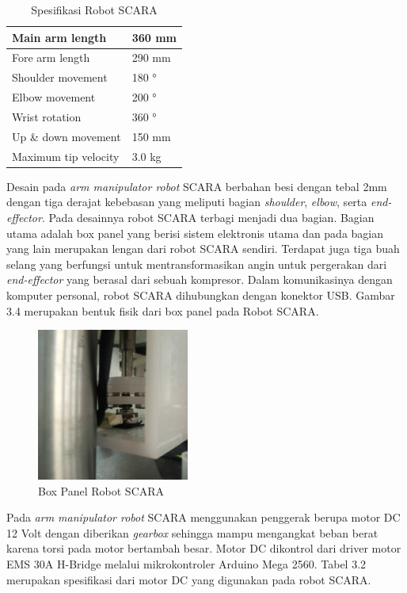 \begin{table}[H]
	\centering
	\caption{Spesifikasi Robot SCARA}
	
		\begin{tabular}{|l|l|}
			\hline
			Main arm length      & 360 mm		\\ \hline
			Fore arm length      & 290 mm  				\\ \hline
			Shoulder movement    & 180 °  		\\ \hline
			Elbow movement       & 200 °   		\\ \hline
			Wrist rotation       & 360 ° 		\\ \hline
			Up \& down movement  & 150 mm   				\\ \hline
			Maximum tip velocity & 3.0 kg  				\\ \hline
		\end{tabular} 
	\end{table}
Desain pada\textit{ arm manipulator robot} SCARA berbahan besi dengan tebal 2mm dengan tiga derajat kebebasan yang meliputi bagian \textit{shoulder}, \textit{elbow}, serta \textit{end-effector}. Pada desainnya robot SCARA terbagi menjadi dua bagian. Bagian utama adalah box panel yang berisi sistem elektronis utama dan pada bagian yang lain merupakan lengan dari robot SCARA sendiri. Terdapat juga tiga buah selang yang berfungsi untuk mentransformasikan angin untuk pergerakan dari \textit{end-effector} yang berasal dari sebuah kompresor.  Dalam komunikasinya dengan komputer personal, robot SCARA dihubungkan dengan konektor USB. Gambar 3.4 merupakan bentuk fisik dari box panel pada Robot SCARA.
\begin{figure}[H]
	\centering
	\includegraphics[width=5cm]{gambar/potsementara.jpg}
	\caption{Box Panel Robot SCARA}
\end{figure}

Pada \textit{arm manipulator robot} SCARA menggunakan penggerak berupa motor DC 12 Volt dengan diberikan \textit{gearbox} sehingga mampu mengangkat beban berat karena torsi pada motor bertambah besar. Motor DC dikontrol dari driver motor EMS 30A H-Bridge melalui mikrokontroler Arduino Mega 2560. Tabel 3.2 merupakan spesifikasi dari motor DC yang digunakan pada robot SCARA. 

